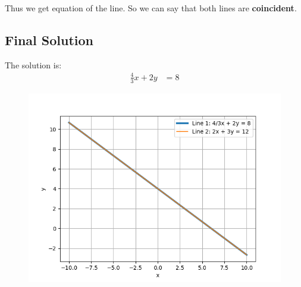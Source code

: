 \documentclass[journal]{IEEEtran}
\begin{document}
	Thus we get equation of the line. So we can say that both lines are \textbf{coincident}.
	
	\subsection*{Final Solution}
	The solution is:
	\begin{align}
		\frac{4}{3}x + 2y &= 8
	\end{align}

\begin{figure}[h]
    \centering
    \includegraphics[width=\columnwidth]{figs/Figure_1.png}
    \label{fig:Plot}
    \end{figure}
\end{document}
